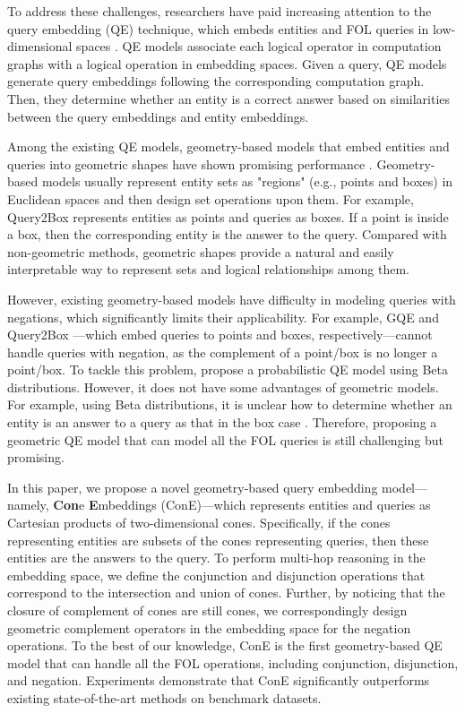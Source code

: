 \documentclass{article}
\begin{document}
To address these challenges, researchers have paid increasing attention to the query embedding (QE) technique, which embeds entities and FOL queries in low-dimensional spaces \cite{gqe,q2b,beta,faith}.  
QE models associate each logical operator in computation graphs with a logical operation in embedding spaces.
Given a query, QE models generate query embeddings following the corresponding computation graph.
Then, they determine whether an entity is a correct answer based on similarities between the query embeddings and entity embeddings. 

Among the existing QE models, geometry-based models that embed entities and queries into geometric shapes have shown promising performance \cite{gqe,traversing,chains,q2b}. Geometry-based models usually represent entity sets as "regions" (e.g., points and boxes) in Euclidean spaces and then design set operations upon them. For example, Query2Box \cite{q2b} represents entities as points and queries as boxes. If a point is inside a box, then the corresponding entity is the answer to the query. Compared with non-geometric methods, geometric shapes provide a natural and easily interpretable way to represent sets and logical relationships among them.

However, existing geometry-based models have difficulty in modeling queries with negations, which significantly limits their applicability. For example, GQE \cite{gqe} and Query2Box \cite{q2b}---which embed queries to points and boxes, respectively---cannot handle queries with negation, as the complement of a point/box is no longer a point/box. To tackle this problem, \citet{beta} propose a probabilistic QE model using Beta distributions. However, it does not have some advantages of geometric models. For example, using Beta distributions, it is unclear how to determine whether an entity is an answer to a query as that in the box case \cite{q2b}. Therefore, proposing a geometric QE model that can model all the FOL queries is still challenging but promising.

In this paper, we propose a novel geometry-based query embedding model---namely, \textbf{Con}e \textbf{E}mbeddings (ConE)---which represents entities and queries as Cartesian products of two-dimensional cones. Specifically, if the cones representing entities are subsets of the cones representing queries, then these entities are the answers to the query.
To perform multi-hop reasoning in the embedding space, we define the conjunction and disjunction operations that correspond to the intersection and union of cones.
Further, by noticing that the closure of complement of cones are still cones, we correspondingly design geometric complement operators in the embedding space for the negation operations.
To the best of our knowledge, ConE is the first geometry-based QE model that can handle all the FOL operations, including conjunction, disjunction, and negation.
Experiments demonstrate that ConE significantly outperforms existing state-of-the-art methods on benchmark datasets.
\end{document}

